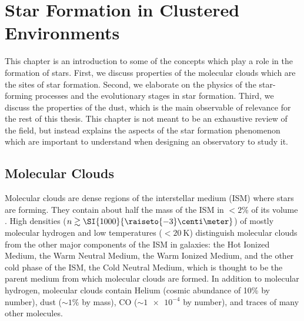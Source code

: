 \chapter{Star Formation in Clustered Environments} %

\label{chap:StarFormation}


This chapter is an introduction to some of the concepts which play a role in the formation of stars. First, we discuss properties of the molecular clouds which are the sites of star formation. Second, we elaborate on the physics of the star-forming processes and the evolutionary stages in star formation. Third, we discuss the properties of the dust, which is the main observable of relevance for the rest of this thesis. This chapter is not meant to be an exhaustive review of the field, but instead explains the aspects of the star formation phenomenon which are important to understand when designing an observatory to study it.

\section{Molecular Clouds}

Molecular clouds are dense regions of the interstellar medium (ISM) where stars are forming. They contain about half the mass of the ISM in $<2$\% of its volume \citep[see][and references therein]{Kennicutt:2012ey}. High densities ($n \gtrsim \SI{1000}{\raiseto{-3}\centi\meter}$) of mostly molecular hydrogen and low temperatures ($< \SI{20}{\kelvin}$) distinguish molecular clouds from the other major components of the ISM in galaxies: the Hot Ionized Medium, the Warm Neutral Medium, the Warm Ionized Medium, and the other cold phase of the ISM, the Cold Neutral Medium, which is thought to be the parent medium from which molecular clouds are formed. In addition to molecular hydrogen, molecular clouds contain Helium (cosmic abundance of 10\% by number), dust ($\sim 1\%$ by mass), CO ($\sim \num{1e-4}$ by number), and traces of many other molecules.

